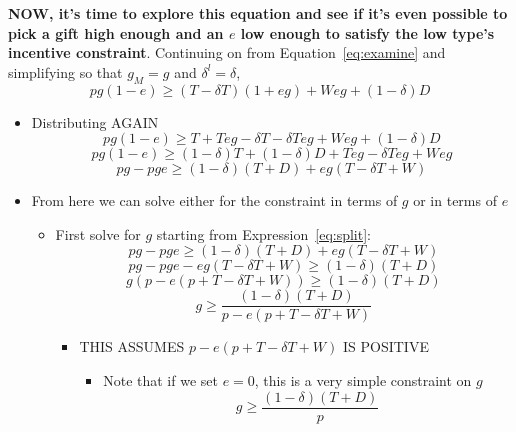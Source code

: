 \documentclass[12pt]{article}
\newcommand{\de}{\delta}
\begin{document}
\textbf{NOW, it's time to explore this equation and see if it's even possible to pick a gift high enough and an $e$ low enough to satisfy the low type's incentive constraint}. Continuing on from Equation~\ref{eq:examine} and simplifying so that $g_M = g$ and $\de^l = \de$,
\[
	pg\left(1 - e\right) \geq \left(T - \de T \right) \left(1 + eg\right) + Weg + \left(1 - \de \right) D
\]
	\begin{itemize}
		\item Distributing AGAIN
			\[
				pg	\left(1 - e\right) \geq T + Teg - \de T - \de T eg + Weg + \left(1 - \de \right) D
			\]
			\[
				pg	\left(1 - e\right) \geq \left(1 - \de \right) T + \left(1 - \de \right) D + Teg - \de T eg + Weg
			\]
			\begin{equation}
				pg - pge \geq \left(1 - \de \right) \left( T + D \right) + eg \left( T - \de T + W \right)
				\label{eq:split}
			\end{equation}
		\item From here we can solve either for the constraint in terms of $g$ or in terms of $e$
			\begin{itemize}
				\item First solve for $g$ starting from Expression~\ref{eq:split}:
					$$pg - pge \geq \left(1 - \de \right) \left( T + D \right) + eg \left( T - \de T + W \right)$$
					$$pg - pge - eg \left( T - \de T + W \right)\geq \left(1 - \de \right) \left( T + D \right)$$
					\begin{equation}
						g \left(p - e \left( p + T - \de T + W \right) \right) \geq \left(1 - \de \right) \left( T + D \right)
						\label{eq:g1}
					\end{equation}
					\begin{equation}
						g \geq \frac{\left(1 - \de \right) \left( T + D \right)}{p - e \left( p + T - \de T + W \right)}
						\label{eq:g2}
					\end{equation}
						\begin{itemize}
							\item THIS ASSUMES {\color{red} $p - e \left( p + T - \de T + W \right)$ IS POSITIVE}
								\begin{itemize}
									\item Note that if we set $e=0$, this is a very simple constraint on $g$
										\begin{equation}
											g \geq \frac{\left(1 - \de \right) \left( T + D \right)}{p}
											\label{eq:g3}
										\end{equation}
								\end{itemize}

\end{itemize}
\end{itemize}
\end{itemize}
\end{document}
